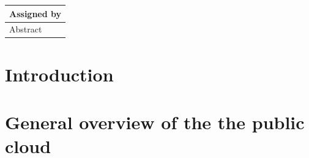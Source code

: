 \documentclass{article}
\begin{document}
\begin{table}[]
\begin{tabular}{|l|l|l|}
\multicolumn{3}{|l|}{Assigned by}                                                                                                                                                                                                                                    \\ \hline
\multicolumn{3}{|l|}{\multirow{5}{*}{Abstract}}                                                                                                                                                                                                                      \\
\multicolumn{3}{|l|}{}                                                                                                                                                                                                                                               \\
\multicolumn{3}{|l|}{}                                                                                                                                                                                                                                               \\
\multicolumn{3}{|l|}{}                                                                                                                                                                                                                                               \\
\multicolumn{3}{|l|}{}                                                                                                                                                                                                                                               \\ \hline
\end{tabular}
\end{table}
\clearpage

\doublespacing
\tableofcontents
\pagebreak 
\setcounter{page}{1}
\rhead{\thepage}
\section{Introduction}
\blindtext[2]
\section{General overview of the the public cloud}
\blindtext[2]
\end{document}
